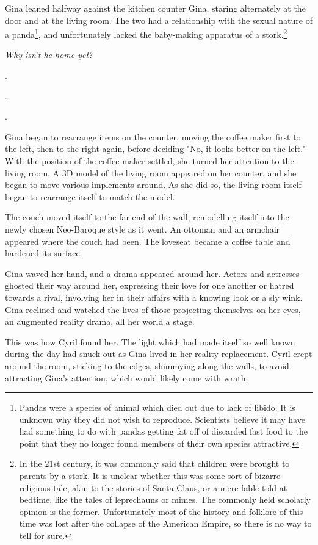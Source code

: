 \documentclass[12pt]{article}
\begin{document}
Gina leaned halfway against the kitchen counter Gina, staring alternately at the door and at the living room. The two had a relationship with the sexual nature of a panda\footnote{Pandas were a species of animal which died out due to lack of libido. It is unknown why they did not wish to reproduce. Scientists believe it may have had something to do with pandas getting fat off of discarded fast food to the point that they no longer found members of their own species attractive.}, and unfortunately lacked the baby-making apparatus of a stork.\footnote{In the 21st century, it was commonly said that children were brought to parents by a stork. It is unclear whether this was some sort of bizarre religious tale, akin to the stories of Santa Claus, or a mere fable told at bedtime, like the tales of leprechauns or mimes. The commonly held scholarly opinion is the former. Unfortunately most of the history and folklore of this time was lost after the collapse of the American Empire, so there is no way to tell for sure.}

\emph{Why isn't he home yet?}

.

.

.

Gina began to rearrange items on the counter, moving the coffee maker first to the left, then to the right again, before deciding "No, it looks better on the left." With the position of the coffee maker settled, she turned her attention to the living room. A 3D model of the living room appeared on her counter, and she began to move various implements around. As she did so, the living room itself began to rearrange itself to match the model.

The couch moved itself to the far end of the wall, remodelling itself into the newly chosen Neo-Baroque style as it went. An ottoman and an armchair appeared where the couch had been. The loveseat became a coffee table and hardened its surface.

Gina waved her hand, and a drama appeared around her. Actors and actresses ghosted their way around her, expressing their love for one another or hatred towards a rival, involving her in their affairs with a knowing look or a sly wink. Gina reclined and watched the lives of those projecting themselves on her eyes, an augmented reality drama, all her world a stage.

This was how Cyril found her. The light which had made itself so well known during the day had snuck out as Gina lived in her reality replacement. Cyril crept around the room, sticking to the edges, shimmying along the walls, to avoid attracting Gina's attention, which would likely come with wrath.
\end{document}
